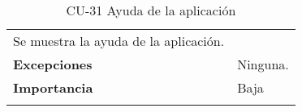 \begin{longtable}[t]{@{}ll@{}}
\begin{minipage}[t]{0.71\columnwidth}
Se muestra la ayuda de la aplicación.\strut
\end{minipage}\tabularnewline
\begin{minipage}[t]{0.23\columnwidth}\raggedright\strut
\textbf{Excepciones}\strut
\end{minipage} & \begin{minipage}[t]{0.71\columnwidth}\raggedright\strut
Ninguna. \strut
\end{minipage}\tabularnewline
\begin{minipage}[t]{0.23\columnwidth}\raggedright\strut
\textbf{Importancia}\strut
\end{minipage} & \begin{minipage}[t]{0.71\columnwidth}\raggedright\strut
Baja\strut
\end{minipage}\tabularnewline
\bottomrule
\caption{CU-31 Ayuda de la aplicación}
\end{longtable}